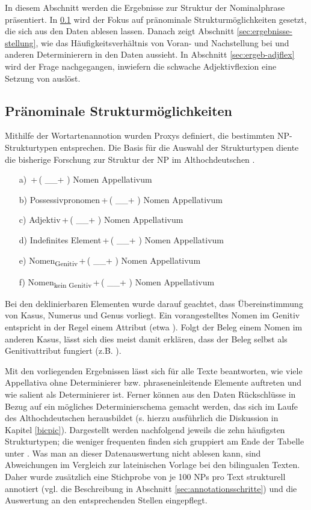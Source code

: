 In diesem Abschnitt werden die Ergebnisse zur Struktur der Nominalphrase präsentiert. In \ref{sec:ergeb-np-struktur} wird der Fokus auf pränominale Strukturmöglichkeiten gesetzt, die sich aus den Daten ablesen lassen. Danach zeigt Abschnitt \ref{sec:ergebnisse-stellung}, wie das Häufigkeitsverhältnis von Voran- und Nachstellung bei  und anderen Determinierern in den Daten aussieht. In Abschnitt \ref{sec:ergeb-adjflex} wird der Frage nachgegangen, inwiefern die schwache Adjektivflexion eine Setzung von   auslöst. 

\subsection{Pränominale Strukturmöglichkeiten}\label{sec:ergeb-np-struktur}

Mithilfe der Wortartenannotion wurden Proxys definiert, die bestimmten NP-Strukturtypen entsprechen. Die Basis für die Auswahl der Strukturtypen diente die bisherige Forschung zur Struktur der NP im Althochdeutschen \parencite[vor allem][]{Oubouzar1989}. 

\begin{itemize}
\item [a)] \,+\,( \_\_+ )  Nomen Appellativum
\item [b)] Possessivpronomen\,+\,( \_\_+ )  Nomen Appellativum
\item [c)] Adjektiv\,+\,( \_\_+ )  Nomen Appellativum
\item [d)] Indefinites Element\,+\,( \_\_+ )   Nomen Appellativum
\item [e)] Nomen\textsubscript{Genitiv}\,+\,( \_\_+ )   Nomen Appellativum
\item [f)] Nomen\textsubscript{kein Genitiv}\,+\,( \_\_+ )   Nomen Appellativum
\end{itemize}

\noindent 
Bei den deklinierbaren Elementen wurde darauf geachtet, dass Übereinstimmung von Kasus, Numerus und Genus vorliegt. Ein vorangestelltes Nomen im Genitiv entspricht in der Regel einem Attribut (etwa ). Folgt der Beleg einem Nomen im anderen Kasus, lässt sich dies meist damit erklären, dass  der Beleg selbst als Genitivattribut fungiert (z.B. ). 
 
Mit den vorliegenden Ergebnissen lässt sich für alle Texte beantworten, wie viele Appellativa ohne Determinierer bzw. phraseneinleitende Elemente auftreten und wie salient  als Determinierer ist. Ferner können aus den Daten Rückschlüsse in Bezug auf ein mögliches  Determinierschema gemacht werden, das sich im Laufe des Althochdeutschen herausbildet (s. hierzu ausführlich die Diskussion in Kapitel \ref{bicpic}). Dargestellt werden nachfolgend jeweils die zehn häufigsten Strukturtypen; die weniger frequenten finden sich gruppiert am Ende der Tabelle unter .  Was man an dieser Datenauswertung  nicht ablesen kann, sind  Abweichungen im Vergleich zur lateinischen Vorlage bei den bilingualen Texten. Daher wurde zusätzlich eine Stichprobe von je 100 NPs pro Text strukturell annotiert (vgl. die Beschreibung in Abschnitt \ref{sec:annotationsschritte}) und die Auswertung an den entsprechenden Stellen eingepflegt.

